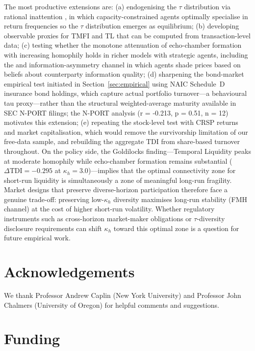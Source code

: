\documentclass[preprint,12pt,authoryear]{elsarticle}
\begin{document}
The most productive extensions are:
(a) endogenising the $\tau$ distribution via rational inattention
\citep{sims2003}, in which capacity-constrained agents optimally specialise
in return frequencies so the $\tau$ distribution emerges as equilibrium;
(b) developing observable proxies for TMFI and TL that can be computed from
transaction-level data;
(c) testing whether the monotone attenuation of echo-chamber formation with
increasing homophily holds in richer models with strategic agents, including
the \citet{kyle1985} and \citet{akerlof1970} information-asymmetry channel
in which agents shade prices based on beliefs about counterparty information
quality;
(d) sharpening the bond-market empirical test initiated in
Section~\ref{sec:empirical} using NAIC Schedule~D insurance bond holdings,
which capture actual portfolio turnover---a behavioural tau proxy---rather
than the structural weighted-average maturity available in SEC N-PORT filings;
the N-PORT analysis (r = -0.213, p = 0.51, n = 12) motivates this extension;
(e) repeating the stock-level test with CRSP returns and market capitalisation,
which would remove the survivorship limitation of our free-data sample, and
rebuilding the aggregate TDI from share-based turnover throughout.
On the policy side, the Goldilocks finding---Temporal Liquidity peaks at
moderate homophily while echo-chamber formation remains substantial
($\Delta\mathrm{TDI} = -0.295$ at $\kappa_h = 3.0$)---implies
that the optimal connectivity zone for short-run liquidity is simultaneously
a zone of meaningful long-run fragility.
Market designs that preserve diverse-horizon participation therefore face a
genuine trade-off: preserving low-$\kappa_h$ diversity maximises long-run
stability (FMH channel) at the cost of higher short-run volatility.
Whether regulatory instruments such as cross-horizon market-maker
obligations or $\tau$-diversity disclosure requirements can shift
$\kappa_h$ toward this optimal zone is a question for future empirical work.

\section*{Acknowledgements}

We thank Professor Andrew Caplin (New York University) and Professor John Chalmers (University of Oregon) for helpful comments and suggestions.

\section*{Funding}
\end{document}
